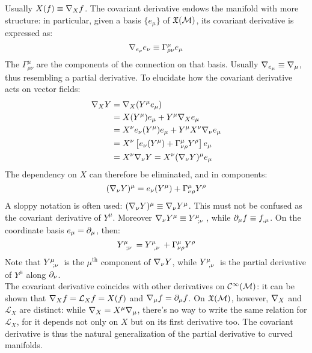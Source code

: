 Usually $ X(f) \equiv \nabla_X f $. The covariant derivative endows the manifold with more structure: in particular, given a basis $ \{e_{\mu}\} $ of $ \mathfrak{X}(\mathcal{M}) $, its covariant derivative is expressed as:
\begin{equation}
  \nabla_{e_{\rho}} e_{\nu} \equiv \Gamma^{\mu}_{\rho \nu} e_{\mu}
  \label{eq:3.24}
\end{equation}
The $ \Gamma^{\mu}_{\rho \nu} $ are the components of the connection on that basis. Usually $ \nabla_{e_{\mu}} \equiv \nabla_{\mu} $, thus resembling a partial derivative. To elucidate how the covariant derivative acts on vector fields:
\begin{equation*}
  \begin{split}
    \nabla_X Y
    &= \nabla_X (Y^\mu e_\mu) \\
    &= X(Y^\mu) e_\mu + Y^\mu \nabla_X e_\mu \\
    &= X^{\nu} e_{\nu} (Y^{\mu}) e_{\mu} + Y^{\mu} X^{\nu} \nabla_{\nu} e_{\mu} \\
    &= X^{\nu} \left[ e_{\nu}(Y^{\mu}) + \Gamma^{\mu}_{\nu \rho} Y^{\rho} \right] e_{\mu} \\
    &= X^{\nu} \nabla_{\nu} Y = X^{\nu} (\nabla_{\nu} Y)^{\mu} e_{\mu}
  \end{split}
\end{equation*}
The dependency on $ X $ can therefore be eliminated, and in components:
\begin{equation}
  (\nabla_\nu Y)^\mu = e_\nu (Y^\mu) + \Gamma^\mu_{\nu \rho} Y^\rho
  \label{eq:3.25}
\end{equation}
A sloppy notation is often used: $ (\nabla_\nu Y)^\mu \equiv \nabla_\nu Y^\mu $. This must not be confused as the covariant derivative of $ Y^\mu $. Moreover $ \na_\nu Y^\mu \equiv \tensor{Y}{^\mu_{;\nu}} $, while $ \partial_\mu f \equiv f_{,\mu} $. On the coordinate basis $ e_\mu = \partial_\mu $, then:
\begin{equation}
  \tensor{Y}{^\mu_{;\nu}} = \tensor{Y}{^\mu_{,\nu}} + \Gamma^\mu_{\nu \rho} Y^\rho
  \label{eq:3.26}
\end{equation}
Note that $ \tensor{Y}{^\mu_{;\nu}} $ is the $ \mu^{\text{th}} $ component of $ \nabla_\nu Y $, while $ \tensor{Y}{^\mu_{,\nu}} $ is the partial derivative of $ Y^{\mu} $ along $ \partial_{\nu} $.\\
The covariant derivative coincides with other derivatives on $ \mathcal{C}^{\infty}(\mathcal{M}) $: it can be shown that $ \nabla_X f = \mathcal{L}_X f = X(f) $ and $ \nabla_\mu f = \partial_\mu f $. On $ \mathfrak{X}(\mathcal{M}) $, however, $ \nabla_X $ and $ \mathcal{L}_X $ are distinct: while $ \nabla_X = X^\mu \nabla_\mu $, there's no way to write the same relation for $ \mathcal{L}_X $, for it depends not only on $ X $ but on its first derivative too. The covariant derivative is thus the natural generalization of the partial derivative to curved manifolds.


